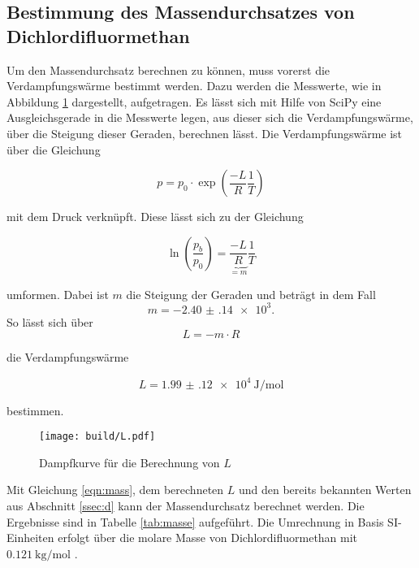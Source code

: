 \subsection{Bestimmung des Massendurchsatzes von Dichlordifluormethan}
\label{ssec:e}
Um den Massendurchsatz berechnen zu können, muss vorerst die Verdampfungswärme bestimmt werden. Dazu werden die Messwerte, wie in Abbildung \ref{fig:dampfdruck_plot} dargestellt, aufgetragen. Es lässt sich mit Hilfe von SciPy \cite{scipy} eine Ausgleichsgerade in die Messwerte legen, aus dieser sich die Verdampfungswärme, über die Steigung dieser Geraden, berechnen lässt. 
Die Verdampfungswärme ist über die Gleichung

\begin{equation}
    p = p_0 \cdot \exp{\left(\frac{-L}{R}\frac{1}{T}\right)}
    \label{eq:L}
\end{equation}

mit dem Druck verknüpft. Diese lässt sich zu der Gleichung


\begin{equation}
    \ln{\left(\frac{p_b}{p_0}\right)} = \underbrace{\frac{-L}{R}}_{=m} \frac{1}{T}
    \label{eq:L2}
\end{equation}

umformen. Dabei ist $m$ die Steigung der Geraden und beträgt in dem Fall 
\begin{equation*}
    m=\num{-2.40(14)e3}.
\end{equation*}
So lässt sich über
\begin{equation}
    L=-m \cdot R
\end{equation}

die Verdampfungswärme 

\begin{equation*}
    L = \SI{1.99(12)e4}{\joule\per\mol}
    \label{eq:L3}
\end{equation*}

bestimmen. 

\begin{figure}
    \centering
    \texttt{[image: build/L.pdf]}
    \caption{Dampfkurve für die Berechnung von $L$}
    \label{fig:dampfdruck_plot}
\end{figure}

Mit Gleichung \eqref{eqn:mass}, dem berechneten $L$ und den bereits bekannten Werten aus Abschnitt \ref{ssec:d} kann der Massendurchsatz berechnet werden. Die Ergebnisse sind in Tabelle \ref{tab:masse} aufgeführt. Die Umrechnung in Basis SI-Einheiten erfolgt über die molare Masse von Dichlordifluormethan mit $\SI{0.121}{\kilo\g\per\mol}$ \cite{V206}.

